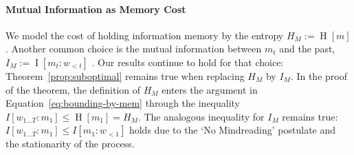 \documentclass[11pt,letterpaper]{article}
\newcommand\mhahn[1]{{\color{red}(#1)}}
\newcounter{theorem}
\begin{document}
\paragraph{Mutual Information as Memory Cost}
We model the cost of holding information memory by the entropy $H_M := \operatorname{H}[m]$.
Another common choice is the mutual information between $m_t$ and the past, $I_M := \operatorname{I}[m_t : w_{<t}]$ \citep{still-information-2014}.
Our results continue to hold for that choice: Theorem~\ref{prop:suboptimal} remains true when replacing $H_M$ by $I_M$.
In the proof of the theorem, the definition of $H_M$ enters the argument in Equation~\ref{eq:bounding-by-mem} through the inequality $I[w_{1\dots T}:m_1] \leq \operatorname{H}[m_1] = H_M$.
The analogous inequality for $I_M$ remains true: $I[w_{1\dots T}:m_1] \leq I[m_{1} : w_{<1}]$ holds due to the `No Mindreading' postulate and the stationarity of the process.



\end{document}
